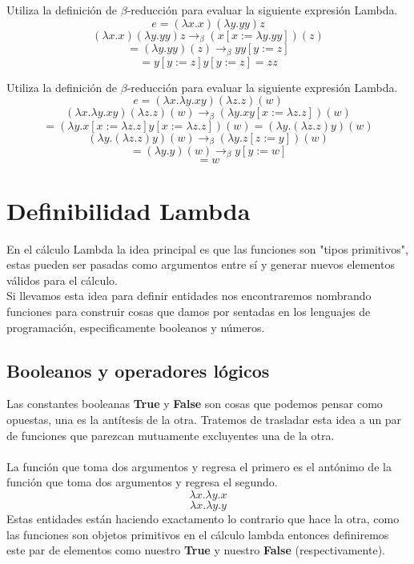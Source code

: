     \begin{exercise}
        Utiliza la definición de $\beta$-reducción para evaluar la siguiente expresión Lambda.
        $$e = (\lambda x.x)(\lambda y.yy) z$$
        \[ (\lambda x.x)(\lambda y.yy) z \rightarrow_\beta (x[x:=\lambda y.yy])(z)\]
        \[ = (\lambda y.yy)(z) \rightarrow_\beta yy[y:=z]\]
        \[ =  y[y:=z]y[y:=z] = zz\]
    \end{exercise}


    \begin{exercise}
        Utiliza la definición de $\beta$-reducción para evaluar la siguiente expresión Lambda.
        $$e= (\lambda x.\lambda y.xy)(\lambda z.z)(w)$$
        \[(\lambda x.\lambda y.xy)(\lambda z.z)(w) \rightarrow_\beta (\lambda y.xy[x := \lambda z.z])(w) \]
        \[ =  (\lambda y.x[x := \lambda z.z]y[x := \lambda z.z])(w) = (\lambda y.(\lambda z.z)y)(w) \]
        \[ (\lambda y.(\lambda z.z)y)(w) \rightarrow_\beta (\lambda y.z[z := y])(w) \]
        \[ = (\lambda y.y)(w) \rightarrow_\beta y[y := w] \]
        \[ = w \]
    \end{exercise}

    \section{Definibilidad Lambda}
    En el cálculo Lambda la idea principal es que las funciones son "tipos primitivos", estas pueden ser pasadas como argumentos entre sí y generar nuevos elementos válidos para el cálculo.\\
    Si llevamos esta idea para definir entidades nos encontraremos nombrando funciones para construir cosas que damos por sentadas en los lenguajes de programación, especificamente booleanos y números.

    \subsection{Booleanos y operadores lógicos}
    Las constantes booleanas \textbf{True} y \textbf{False} son cosas que podemos pensar como opuestas, una es la antítesis de la otra. Tratemos de trasladar esta idea a un par de funciones que parezcan mutuamente excluyentes una de la otra.\\\\
    La función que toma dos argumentos y regresa el primero es el antónimo de la función que toma dos argumentos y regresa el segundo.
    \[
        \lambda x.\lambda y.x
    \]
    \[
        \lambda x.\lambda y.y
    \]
    Estas entidades están haciendo exactamento lo contrario que hace la otra, como las funciones son objetos primitivos en el cálculo lambda entonces definiremos este par de elementos como nuestro \textbf{True} y nuestro \textbf{False} (respectivamente).

